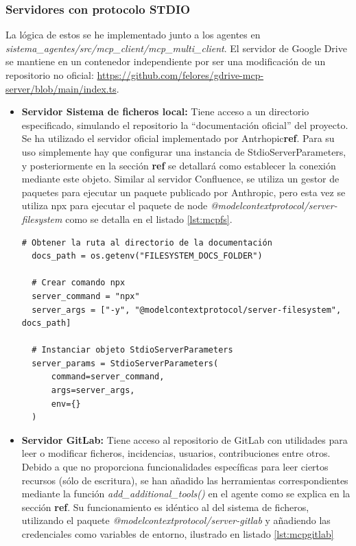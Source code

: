 \subsubsection{Servidores con protocolo STDIO}
La lógica de estos se he implementado junto a los agentes en \textit{sistema\_agentes/src/mcp\_client/mcp\_multi\_client}. El servidor de Google Drive se mantiene en un contenedor independiente por ser una modificación de un repositorio no oficial: \url{https://github.com/felores/gdrive-mcp-server/blob/main/index.ts}.
\begin{itemize}
  \item\textbf{Servidor Sistema de ficheros local: }Tiene acceso a un directorio especificado, simulando el repositorio la ``documentación oficial'' del proyecto. 
    Se ha utilizado el servidor oficial implementado por Antrhopic\textbf{ref}. Para su uso simplemente hay que configurar una instancia de StdioServerParameters, y posteriormente en la sección \textbf{ref} se detallará como establecer la conexión mediante este objeto. Similar al servidor Confluence, se utiliza un gestor de paquetes para ejecutar un paquete publicado por Anthropic, pero esta vez se utiliza npx para ejecutar el paquete de node \textit{@modelcontextprotocol/server-filesystem} como se detalla en el listado \ref{lst:mcpfs}. 

\begin{lstlisting}[caption={Instanciado de StdioServerParameters para el servidor MCP de sistema de ficheros},label={lst:mcpfs}]
  # Obtener la ruta al directorio de la documentación 
  docs_path = os.getenv("FILESYSTEM_DOCS_FOLDER")

  # Crear comando npx
  server_command = "npx"
  server_args = ["-y", "@modelcontextprotocol/server-filesystem", docs_path]

  # Instanciar objeto StdioServerParameters 
  server_params = StdioServerParameters(
      command=server_command,
      args=server_args,
      env={}
  )
\end{lstlisting}

\item\textbf{Servidor GitLab: }Tiene acceso al repositorio de GitLab con utilidades para leer o modificar ficheros, incidencias, usuarios, contribuciones entre otros. Debido a que no proporciona funcionalidades específicas para leer ciertos recursos (sólo de escritura), se han añadido las herramientas correspondientes mediante la función \textit{add\_additional\_tools()} en el agente como se explica en la sección \textbf{ref}. Su funcionamiento es idéntico al del sistema de ficheros, utilizando el paquete \textit{@modelcontextprotocol/server-gitlab} y añadiendo las credenciales como variables de entorno, ilustrado en listado \ref{lst:mcpgitlab}


\end{itemize}
